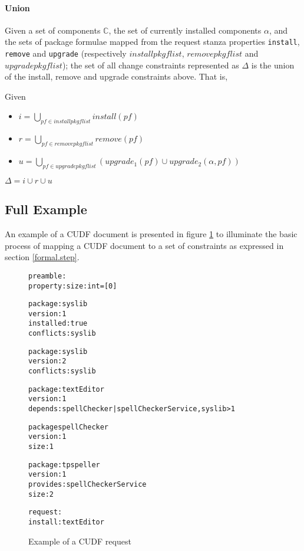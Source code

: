 \paragraph{Union}
Given a set of components $\mathbb{C}$, the set of currently installed components $\alpha$,
and the sets of package formulae mapped from the request stanza properties \verb+install+, \verb+remove+ and \verb+upgrade+ 
(respectively $installpkgflist$, $removepkgflist$ and $upgradepkgflist$);
the set of all change constraints represented as $\Delta$ is the union of the install, remove and upgrade constraints above.
That is, 
\begin{defs}
Given 
\begin{itemize}
  \item $i = \bigcup \limits_{pf \in installpkgflist} install(pf)$
  \item $r = \bigcup \limits_{pf \in removepkgflist} remove(pf)$
  \item $u = \bigcup \limits_{pf \in upgradepkgflist} (upgrade_1(pf) \cup upgrade_2(\alpha,pf))$
\end{itemize}
$\Delta =  i \cup r \cup u$
\end{defs}

\subsection{Full Example}
\label{formal.example}
An example of a CUDF document is presented in figure \ref{formal.CUDFEXAMPLE} to illuminate the basic process of mapping a CUDF document to a set of constraints as expressed in section \ref{formal.step}.

\begin{figure}[htp] 
\begin{center}
\begin{alltt}
preamble:
property: size: int = [0]

package: syslib
version: 1
installed: true
conflicts: syslib

package: syslib
version: 2
conflicts: syslib

package: textEditor
version: 1
depends: spellChecker | spellCheckerService, syslib > 1

package spellChecker
version: 1
size: 1

package: tpspeller
version: 1
provides: spellCheckerService
size: 2

request:
install:textEditor

\end{alltt}
  \caption[CUDF Example]{Example of a CUDF request}
  \label{formal.CUDFEXAMPLE}
\end{center}
\end{figure} 

